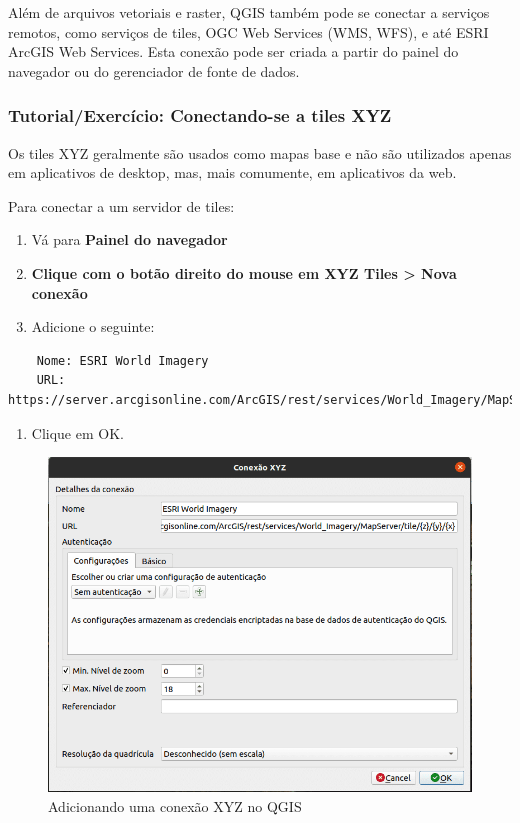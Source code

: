 \documentclass[
]{krantz}
\providecommand{\tightlist}{%
  \setlength{\itemsep}{0pt}\setlength{\parskip}{0pt}}
\begin{document}
Além de arquivos vetoriais e raster, QGIS também pode se conectar a serviços remotos, como serviços de tiles, OGC Web Services (WMS, WFS), e até ESRI ArcGIS Web Services. Esta conexão pode ser criada a partir do painel do navegador ou do gerenciador de fonte de dados.

\hypertarget{tutorialexercuxedcio-conectando-se-a-tiles-xyz}{%
\subsubsection{Tutorial/Exercício: Conectando-se a tiles XYZ}\label{tutorialexercuxedcio-conectando-se-a-tiles-xyz}}

Os tiles XYZ geralmente são usados como mapas base e não são utilizados apenas em aplicativos de desktop, mas, mais comumente, em aplicativos da web.

Para conectar a um servidor de tiles:

\begin{enumerate}
\def\labelenumi{\arabic{enumi}.}
\tightlist
\item
  Vá para \textbf{Painel do navegador}
\item
  \textbf{Clique com o botão direito do mouse em XYZ Tiles \textgreater{} Nova conexão}
\item
  Adicione o seguinte:
\end{enumerate}

\begin{verbatim}
    Nome: ESRI World Imagery
    URL: https://server.arcgisonline.com/ArcGIS/rest/services/World_Imagery/MapServer/tile/{z}/{y}/{x}
\end{verbatim}

\begin{enumerate}
\def\labelenumi{\arabic{enumi}.}
\setcounter{enumi}{3}
\tightlist
\item
  Clique em OK.
\end{enumerate}

\begin{figure}
\centering
\includegraphics{media/modulo2/xyz-1.png}
\caption{Adicionando uma conexão XYZ no QGIS}
\end{figure}
\end{document}
